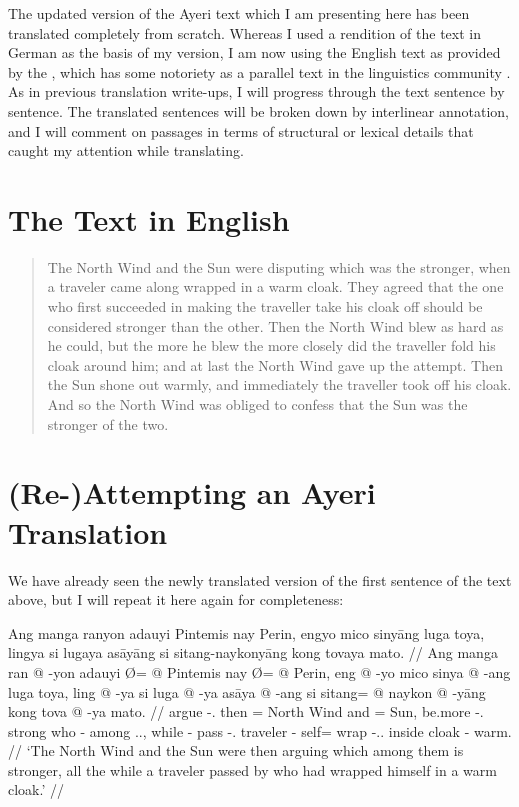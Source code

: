 \documentclass[12pt,paper=a4]{scrartcl}
\begin{document}
The updated version of the Ayeri text which I am presenting here has been translated completely from scratch. Whereas I used a rendition of the text in German as the basis of my \citeyear{becker2004} version, I am now using the English text as provided by the , which has some notoriety as a parallel text in the linguistics community \autocite[see e.g.][97]{cysouwwälchli2007}. As in previous translation write-ups, I will progress through the text sentence by sentence. The translated sentences will be broken down by interlinear annotation, and I will comment on passages in terms of structural or lexical details that caught my attention while translating.

\section{The Text in English}

\blockcquote[39]{ipa2007}{The North Wind and the Sun were disputing which was the stronger, when a traveler came along wrapped in a warm cloak. They agreed that the one who first succeeded in making the traveller take his cloak off should be considered stronger than the other. Then the North Wind blew as hard as he could, but the more he blew the more closely did the traveller fold his cloak around him; and at last the North Wind gave up the attempt. Then the Sun shone out warmly, and immediately the traveller took off his cloak. And so the North Wind was obliged to confess that the Sun was the stronger of the two.}

\section{(Re-)Attempting an Ayeri Translation}

We have already seen the newly translated version of the first sentence of the text above, but I will repeat it here again for completeness:

\ex %
\begingl
	\glpreamble Ang manga ranyon adauyi Pintemis nay Perin, engyo mico sinyāng luga toya, lingya si lugaya asāyāng si sitang-naykonyāng kong tovaya mato. //
	\gla Ang manga ran @ -yon adauyi Ø= @ Pintemis nay Ø= @ Perin, eng @ -yo mico sinya @ -ang luga toya, ling @ -ya si luga @ -ya asāya @ -ang si sitang= @ naykon @ -yāng kong tova @ -ya mato. //
	\glb \AgtT{} \Prog{} argue -\Tpl{}.\N{} then \Top{}= {North Wind} and \Top{}= Sun, be.more -\Tsg{}.\N{} strong who -\Aarg{} among \Tpl{}.\N{}.\Loc{}, while -\Loc{} \Rel{} pass -\Tsg{}.\M{} traveler -\Aarg{} \Rel{} self= wrap -\Tsg{}.\M{}.\Aarg{} inside cloak -\Loc{} warm. //
	\glft `The North Wind and the Sun were then arguing which among them is stronger, all the while a traveler passed by who had wrapped himself in a warm cloak.' //
\endgl
\xe
\end{document}
